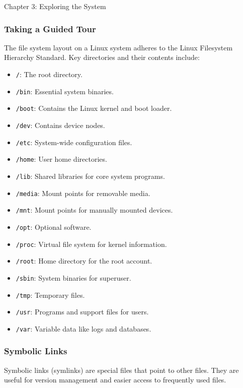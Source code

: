 \begin{notes}{Chapter 3: Exploring the System}
    \subsubsection*{Taking a Guided Tour}

    The file system layout on a Linux system adheres to the Linux Filesystem Hierarchy Standard. Key directories and their contents include:

    \begin{highlight}
    \begin{itemize}
        \item \texttt{/}: The root directory.
        \item \texttt{/bin}: Essential system binaries.
        \item \texttt{/boot}: Contains the Linux kernel and boot loader.
        \item \texttt{/dev}: Contains device nodes.
        \item \texttt{/etc}: System-wide configuration files.
        \item \texttt{/home}: User home directories.
        \item \texttt{/lib}: Shared libraries for core system programs.
        \item \texttt{/media}: Mount points for removable media.
        \item \texttt{/mnt}: Mount points for manually mounted devices.
        \item \texttt{/opt}: Optional software.
        \item \texttt{/proc}: Virtual file system for kernel information.
        \item \texttt{/root}: Home directory for the root account.
        \item \texttt{/sbin}: System binaries for superuser.
        \item \texttt{/tmp}: Temporary files.
        \item \texttt{/usr}: Programs and support files for users.
        \item \texttt{/var}: Variable data like logs and databases.
    \end{itemize}
    \end{highlight}

    \subsubsection*{Symbolic Links}

    Symbolic links (symlinks) are special files that point to other files. They are useful for version management and easier access to frequently used files.


\end{notes}
